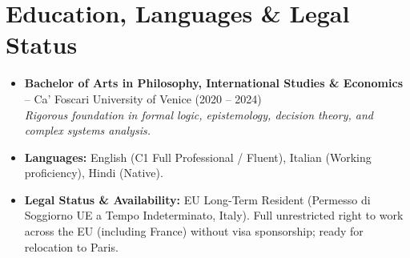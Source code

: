 \documentclass[a4paper,10pt]{article}
\begin{document}
\section{Education, Languages \& Legal Status}
\begin{itemize}
  \item \textbf{Bachelor of Arts in Philosophy, International Studies \& Economics} -- Ca' Foscari University of Venice (2020 -- 2024) \\
  \textit{Rigorous foundation in formal logic, epistemology, decision theory, and complex systems analysis.}
  \item \textbf{Languages:} English (C1 Full Professional / Fluent), Italian (Working proficiency), Hindi (Native).
  \item \textbf{Legal Status \& Availability:} EU Long-Term Resident (Permesso di Soggiorno UE a Tempo Indeterminato, Italy). Full unrestricted right to work across the EU (including France) without visa sponsorship; ready for relocation to Paris.
\end{itemize}
\end{document}
